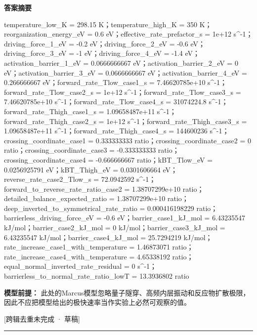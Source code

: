\documentclass[UTF8,11pt,a4paper]{ctexart}
\begin{document}
\noindent\textbf{答案摘要}\par
temperature\_low\_K = 298.15 K；temperature\_high\_K = 350 K；reorganization\_energy\_eV = 0.6 eV；effective\_rate\_prefactor\_s = 1e+12 s\textasciicircum{}-1；driving\_force\_1\_eV = -0.2 eV；driving\_force\_2\_eV = -0.6 eV；driving\_force\_3\_eV = -1 eV；driving\_force\_4\_eV = -1.4 eV；activation\_barrier\_1\_eV = 0.0666666667 eV；activation\_barrier\_2\_eV = 0 eV；activation\_barrier\_3\_eV = 0.0666666667 eV；activation\_barrier\_4\_eV = 0.266666667 eV；forward\_rate\_Tlow\_case1\_s = 7.46620785e+10 s\textasciicircum{}-1；forward\_rate\_Tlow\_case2\_s = 1e+12 s\textasciicircum{}-1；forward\_rate\_Tlow\_case3\_s = 7.46620785e+10 s\textasciicircum{}-1；forward\_rate\_Tlow\_case4\_s = 31074224.8 s\textasciicircum{}-1；forward\_rate\_Thigh\_case1\_s = 1.09658487e+11 s\textasciicircum{}-1；forward\_rate\_Thigh\_case2\_s = 1e+12 s\textasciicircum{}-1；forward\_rate\_Thigh\_case3\_s = 1.09658487e+11 s\textasciicircum{}-1；forward\_rate\_Thigh\_case4\_s = 144600236 s\textasciicircum{}-1；crossing\_coordinate\_case1 = 0.333333333 ratio；crossing\_coordinate\_case2 = 0 ratio；crossing\_coordinate\_case3 = -0.333333333 ratio；crossing\_coordinate\_case4 = -0.666666667 ratio；kBT\_Tlow\_eV = 0.0256925791 eV；kBT\_Thigh\_eV = 0.0301606664 eV；reverse\_rate\_case2\_Tlow\_s = 72.0942592 s\textasciicircum{}-1；forward\_to\_reverse\_rate\_ratio\_case2 = 1.38707299e+10 ratio；detailed\_balance\_expected\_ratio = 1.38707299e+10 ratio；deep\_inverted\_to\_symmetrical\_rate\_ratio = 0.000416198229 ratio；barrierless\_driving\_force\_eV = -0.6 eV；barrier\_case1\_kJ\_mol = 6.43235547 kJ/mol；barrier\_case2\_kJ\_mol = 0 kJ/mol；barrier\_case3\_kJ\_mol = 6.43235547 kJ/mol；barrier\_case4\_kJ\_mol = 25.7294219 kJ/mol；rate\_increase\_case1\_with\_temperature = 1.46873071 ratio；rate\_increase\_case4\_with\_temperature = 4.65338192 ratio；equal\_normal\_inverted\_rate\_residual = 0 s\textasciicircum{}-1；barrierless\_to\_normal\_rate\_ratio\_lowT = 13.3936802 ratio\par
\noindent\textbf{模型前提：}
此处的Marcus模型忽略量子隧穿、高频内层振动和反应物扩散极限，因此不应把模型给出的极快速率当作实验上必然可观察的值。\par
\noindent\textcolor{red!65!black}{[跨辑去重未完成 · 草稿]} \par
\medskip\hrule\medskip
{}
\end{document}
